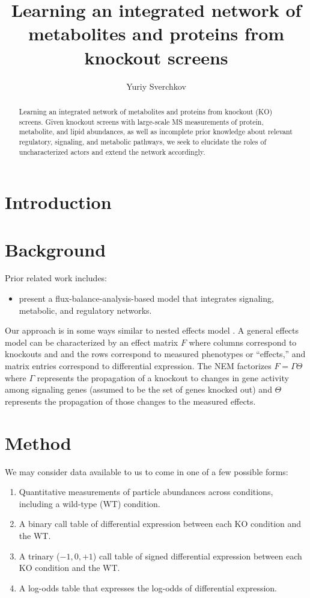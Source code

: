 \documentclass{article}
\title{Learning an integrated network of metabolites and proteins from knockout screens}
\author{Yuriy Sverchkov}
\begin{document}
\maketitle

\begin{abstract}
Learning an integrated network of metabolites and proteins from knockout (KO) screens.
Given knockout screens with large-scale MS measurements of protein, metabolite, and lipid abundances, as well as incomplete prior knowledge about
relevant regulatory, signaling, and metabolic pathways, we seek to elucidate the roles of uncharacterized actors and extend the network accordingly.
\end{abstract}

\section{Introduction}

\section{Background}

Prior related work includes:
\begin{itemize}
 \item \textcite{lee2008dynamic} present a flux-balance-analysis-based model that integrates signaling, metabolic, and regulatory networks.
\end{itemize}

Our approach is in some ways similar to nested effects model \parencite{citation-needed}.
A general effects model can be characterized by an effect matrix $F$ where columns correspond to knockouts and and the rows correspond to measured phenotypes or ``effects,'' and matrix entries correspond to differential expression.
The NEM factorizes $F = \Gamma \Theta$ where $\Gamma$ represents the propagation of a knockout to changes in gene activity among signaling genes (assumed to be the set of genes knocked out) and $\Theta$ represents the propagation of those changes to the measured effects.

\section{Method}

We may consider data available to us to come in one of a few possible forms:
\begin{enumerate}
 \item Quantitative measurements of particle abundances across conditions, including a wild-type (WT) condition.
 \item A binary call table of differential expression between each KO condition and the WT.
 \item A trinary ($-1, 0, +1$) call table of signed differential expression between each KO condition and the WT.
 \item A log-odds table that expresses the log-odds of differential expression.
\end{enumerate}
\end{document}
